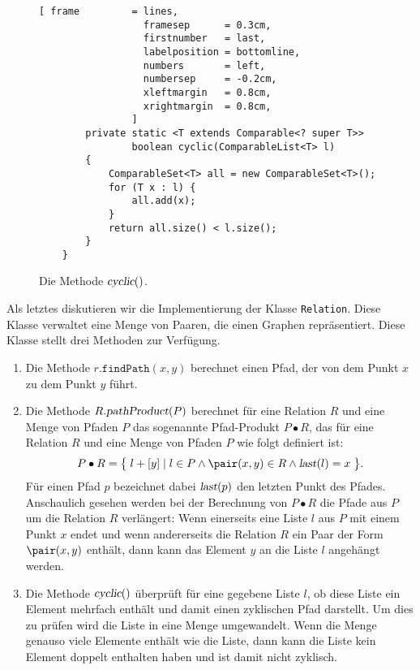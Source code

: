 \begin{figure}[!h]
\centering
\begin{Verbatim}[ frame         = lines, 
                  framesep      = 0.3cm, 
                  firstnumber   = last,
                  labelposition = bottomline,
                  numbers       = left,
                  numbersep     = -0.2cm,
                  xleftmargin   = 0.8cm,
                  xrightmargin  = 0.8cm,
                ]
        private static <T extends Comparable<? super T>>
                boolean cyclic(ComparableList<T> l) 
        {
            ComparableSet<T> all = new ComparableSet<T>();
            for (T x : l) {
                all.add(x);
            }
            return all.size() < l.size();
        }        
    }
\end{Verbatim}
\vspace*{-0.3cm}
\caption{Die Methode $\textsl{cyclic}()$.}
\label{fig:cyclic.java}
\end{figure}
      

\noindent
Als letztes diskutieren wir die Implementierung der Klasse \texttt{Relation}.
Diese Klasse verwaltet eine Menge von Paaren, die einen Graphen repr\"asentiert.
Diese Klasse stellt drei Methoden zur Verf\"ugung.
\begin{enumerate}
\item Die Methode $r.\mathtt{findPath}(x,y)$ berechnet einen Pfad, der von dem Punkt $x$
      zu dem Punkt $y$ f\"uhrt.
\item Die Methode $R.\textsl{pathProduct}(P)$ berechnet f\"ur eine Relation $R$ und
      eine Menge von Pfaden $P$ das sogenannte Pfad-Produkt $P \bullet R$, das f\"ur eine Relation $R$
      und eine Menge von Pfaden $P$ wie folgt definiert ist:
      \[ 
         P \bullet R = \bigl\{\; l + [y] \mid 
         l \in P \wedge \pair(x,y) \in R \wedge \textsl{last}(l) = x \;\bigr\}.
      \]
      F\"ur einen Pfad $p$ bezeichnet dabei $\textsl{last}(p)$ den letzten Punkt des
      Pfades.  Anschaulich gesehen werden bei der Berechnung von $P \bullet R$
      die Pfade aus $P$ um die Relation $R$ verl\"angert:  Wenn einerseits eine Liste $l$ aus
      $P$ mit einem Punkt $x$ endet und wenn andererseits die Relation $R$
      ein Paar der Form $\pair(x, y)$ enth\"alt, dann kann das Element $y$ an die Liste $l$
      angeh\"angt werden.
\item Die Methode $\textsl{cyclic}()$ \"uberpr\"uft f\"ur eine gegebene Liste $l$, ob diese
      Liste ein Element mehrfach enth\"alt und damit einen zyklischen Pfad darstellt.
      Um dies zu pr\"ufen wird die Liste in eine Menge umgewandelt.  Wenn die Menge genauso
      viele Elemente enth\"alt wie die Liste, dann kann die Liste kein Element doppelt
      enthalten haben und ist damit nicht zyklisch.
\end{enumerate}


